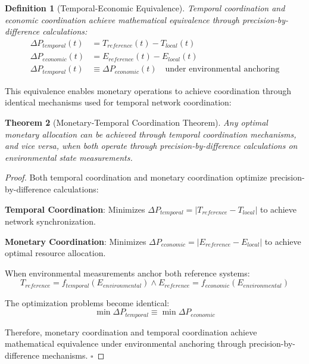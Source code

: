 \documentclass[12pt,a4paper]{article}
\newtheorem{theorem}{Theorem}
\newtheorem{definition}[theorem]{Definition}
\begin{document}
\begin{definition}[Temporal-Economic Equivalence]
Temporal coordination and economic coordination achieve mathematical equivalence through precision-by-difference calculations:
\begin{align}
\Delta P_{temporal}(t) &= T_{reference}(t) - T_{local}(t) \\
\Delta P_{economic}(t) &= E_{reference}(t) - E_{local}(t) \\
\Delta P_{temporal}(t) &\equiv \Delta P_{economic}(t) \quad \text{under environmental anchoring}
\end{align}
\end{definition}

This equivalence enables monetary operations to achieve coordination through identical mechanisms used for temporal network coordination:

\begin{theorem}[Monetary-Temporal Coordination Theorem]
Any optimal monetary allocation can be achieved through temporal coordination mechanisms, and vice versa, when both operate through precision-by-difference calculations on environmental state measurements.
\end{theorem}

\begin{proof}
Both temporal coordination and monetary coordination optimize precision-by-difference calculations:

\textbf{Temporal Coordination}: Minimizes $\Delta P_{temporal} = |T_{reference} - T_{local}|$ to achieve network synchronization.

\textbf{Monetary Coordination}: Minimizes $\Delta P_{economic} = |E_{reference} - E_{local}|$ to achieve optimal resource allocation.

When environmental measurements anchor both reference systems:
\begin{equation}
T_{reference} = f_{temporal}(E_{environmental}) \land E_{reference} = f_{economic}(E_{environmental})
\end{equation}

The optimization problems become identical:
\begin{equation}
\min \Delta P_{temporal} \equiv \min \Delta P_{economic}
\end{equation}

Therefore, monetary coordination and temporal coordination achieve mathematical equivalence under environmental anchoring through precision-by-difference mechanisms. $\square$
\end{proof}
\end{document}
